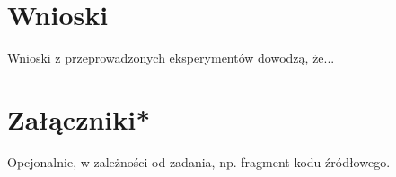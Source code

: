 \documentclass[12pt]{article}
\begin{document}
\section{Wnioski}

Wnioski z przeprowadzonych eksperymentów dowodzą, że...



\section{Załączniki*}

Opcjonalnie, w zależności od zadania,
np. fragment kodu źródłowego.



\renewcommand\refname{Bibliografia}


\end{document}
